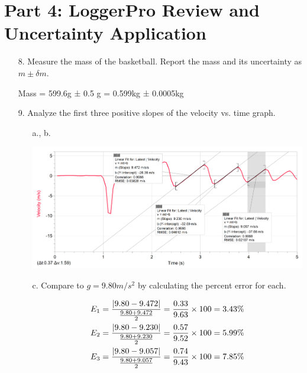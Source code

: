 \documentclass[12pt, letterpaper]{article}
\begin{document}
    \section*{Part 4: LoggerPro Review and Uncertainty Application}
    \begin{enumerate}
        \item [8.] Measure the mass of the basketball. Report the mass and its uncertainty as $m \pm \delta m$.
        
        \begin{mdframed}
            Mass = 599.6g ± 0.5 g = 0.599kg ± 0.0005kg
        \end{mdframed}

        \pagebreak

        \item[9.] Analyze the first three positive slopes of the velocity vs. time graph.
        
        \begin{itemize}
            \item [a., b.]\mbox{}
            
            \begin{mdframed}
                \begin{center}
                    \includegraphics[width=\textwidth]{image3.png}
                \end{center}
            \end{mdframed}

            \item[c.] Compare to $g = 9.80m/s^{2}$ by calculating the percent error for each.
            
            \begin{mdframed}
                \begin{align*}
                    E_{1} & = \frac{|9.80 - 9.472|}{\frac{9.80 + 9.472}{2}}  \time 100
                            = \frac{0.33}{9.63} \times 100 = 3.43 \%    \\
                    E_{2} & = \frac{|9.80 - 9.230|}{\frac{9.80 + 9.230}{2}}  \time 100
                            = \frac{0.57}{9.52} \times 100 = 5.99 \%    \\
                    E_{3} & = \frac{|9.80 - 9.057|}{\frac{9.80 + 9.057}{2}}  \time 100
                            = \frac{0.74}{9.43} \times 100 = 7.85 \%    \\
                \end{align*}


\end{mdframed}
\end{itemize}
\end{enumerate}
\end{document}
